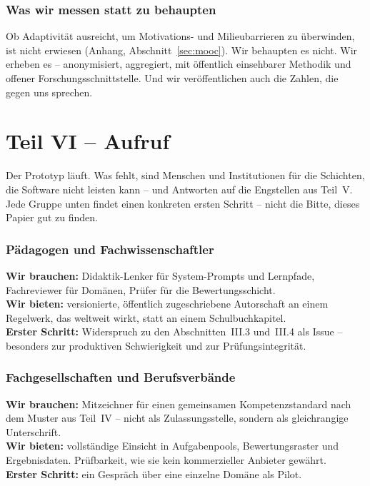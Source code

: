\documentclass[11pt,a4paper]{article}
\newcommand{\teilnummerierung}[1]{%
    \setcounter{section}{0}%
    \renewcommand{\thesection}{#1.\arabic{section}}%
    \renewcommand{\theHsection}{#1.\arabic{section}}%
}
\begin{document}
\section{Was wir messen statt zu behaupten}
Ob Adaptivität ausreicht, um Motivations- und Milieubarrieren zu überwinden, ist nicht erwiesen (Anhang, Abschnitt~\ref{sec:mooc}). Wir behaupten es nicht. Wir erheben es -- anonymisiert, aggregiert, mit öffentlich einsehbarer Methodik und offener Forschungsschnittstelle. Und wir veröffentlichen auch die Zahlen, die gegen uns sprechen.

\part*{Teil VI -- Aufruf}
\teilnummerierung{VI}

\noindent Der Prototyp läuft. Was fehlt, sind Menschen und Institutionen für die Schichten, die Software nicht leisten kann -- und Antworten auf die Engstellen aus Teil~V. Jede Gruppe unten findet einen konkreten ersten Schritt -- nicht die Bitte, dieses Papier gut zu finden.

\section{Pädagogen und Fachwissenschaftler}
\textbf{Wir brauchen:} Didaktik-Lenker für System-Prompts und Lernpfade, Fachreviewer für Domänen, Prüfer für die Bewertungsschicht.\\
\textbf{Wir bieten:} versionierte, öffentlich zugeschriebene Autorschaft an einem Regelwerk, das weltweit wirkt, statt an einem Schulbuchkapitel.\\
\textbf{Erster Schritt:} Widerspruch zu den Abschnitten~III.3 und~III.4 als Issue -- besonders zur produktiven Schwierigkeit und zur Prüfungsintegrität.

\section{Fachgesellschaften und Berufsverbände}
\textbf{Wir brauchen:} Mitzeichner für einen gemeinsamen Kompetenzstandard nach dem Muster aus Teil~IV -- nicht als Zulassungsstelle, sondern als gleichrangige Unterschrift.\\
\textbf{Wir bieten:} vollständige Einsicht in Aufgabenpools, Bewertungsraster und Ergebnisdaten. Prüfbarkeit, wie sie kein kommerzieller Anbieter gewährt.\\
\textbf{Erster Schritt:} ein Gespräch über eine einzelne Domäne als Pilot.
\end{document}
